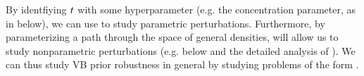 By identfiying $t$ with some hyperparameter (e.g. the concentration parameter,
as in  below), we can use  to study
parametric perturbations.  Furthermore, by parameterizing a path through the
space of general densities,  will allow us to study
nonparametric perturbations (e.g.  below and the
detailed analysis of ).  We
can thus study VB prior robustness in general by studying problems of the
form .
%
%
%
